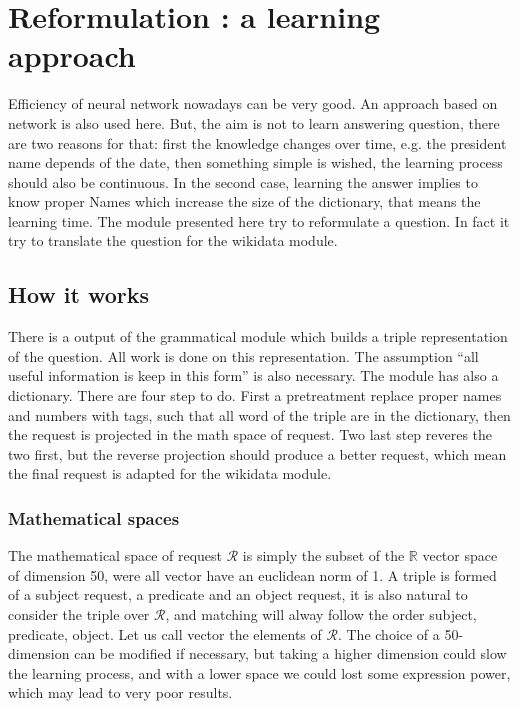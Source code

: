 \section{Reformulation : a learning approach }
\label{mlreformulation}

Efficiency of neural network nowadays can be very good. An approach based on network is also used here. But, the aim is not to learn answering question, there are two reasons for that: first the knowledge changes over time, e.g. the president name depends of the date, then something simple is wished, the learning process should also be continuous. In the second case, learning the answer implies to know proper Names which increase the size of the dictionary, that means the learning time. The module presented here try to reformulate a question. In fact it try to translate the question for the wikidata module.

\subsection{How it works}

There is a output of the grammatical module which builds a triple representation of the question. All work is done on this representation. The assumption ``all useful information is keep in this form''  is also necessary. The module has also a dictionary. There are four step to do. First a pretreatment replace proper names and numbers with tags, such that all word of the triple are in the dictionary, then the request is projected in the math space of request. Two last step reveres the two first, but the reverse projection should produce a better request, which mean the final request is adapted for the wikidata module.

\subsubsection{Mathematical spaces}

The mathematical space of request $\mathcal{R}$ is simply the subset of the $\mathbb{R}$ vector space of dimension 50, were all vector have an euclidean norm of 1.
A triple is formed of a subject request, a predicate and an object request, it is also natural to consider the triple over $\mathcal{R}$, and matching will alway follow the order subject, predicate, object.
Let us call vector the elements of $\mathcal{R}$.
The choice of a 50-dimension can be modified if necessary, but taking a higher dimension could slow the learning process, and with a lower space we could lost some expression power, which may lead to very poor results.

